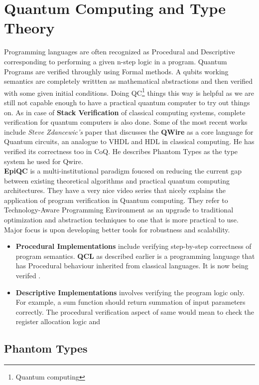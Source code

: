 \chapter{Quantum Computing and Type Theory }
Programming languages are often recognized as Procedural and Descriptive corresponding to performing a given n-step logic in a program. Quantum Programs are verified throughly using Formal methods. A qubits working semantics are completely writtten as mathematical abstractions and then verified with some given initial conditions. Doing QC\footnote{Quantum computing} things this way is helpful as we are still not capable enough to have a practical quantum computer to try out things on. As in case of \textbf{Stack Verification} of classical computing systems, complete verification for quantum computers is also done. Some of the most recent works include \textit{Steve Zdancewic's} paper that discusses the \textbf{QWire} as a core language for Quantum circuits, an analogue to VHDL and HDL in classical computing. He has verified its correctness too in CoQ. He describes Phantom Types as the type system he used for Qwire.\\

\textbf{EpiQC} is a multi-institutional paradigm foucsed on reducing the current gap between existing theoretical algorithms and practical quantum computing architectures. They have a very nice video series that nicely explains the application of program verification in Quantum computing. They refer to Technology-Aware Programming Environment as an upgrade to traditional optimization and abstraction techniques to one that is more practical to use. Major focus is upon developing better tools for robustness and scalability.


\begin{itemize}
\item{
	\textbf{Procedural Implementations} include verifying step-by-step correctness of program semantics. \textbf{QCL} as described earlier is a programming language that has Procedural behaviour inherited from classical languages. It is now being verifed .   
}
\item{
	\textbf{Descriptive Implementations} involves verifying the program logic only. For example, a sum function should return summation of input parameters correctly. The procedural verification aspect of same would mean to check the register allocation logic and 
}
\end{itemize}

\section{Phantom Types}

